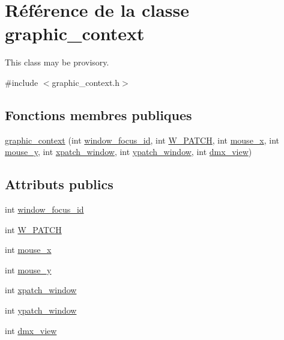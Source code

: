 \hypertarget{classgraphic__context}{\section{Référence de la classe graphic\+\_\+context}
\label{classgraphic__context}
}


This class may be provisory.  




{\ttfamily \#include $<$graphic\+\_\+context.\+h$>$}

\subsection*{Fonctions membres publiques}
\begin{DoxyCompactItemize}
\item 
\hyperlink{classgraphic__context_ac81331f894194151dc9f2f20f6eb86e6}{graphic\+\_\+context} (int \hyperlink{classgraphic__context_afb842574bef9200a343eae5ed25b6aea}{window\+\_\+focus\+\_\+id}, int \hyperlink{classgraphic__context_af8795c6d73bb4076febf90a4bed34cd7}{W\+\_\+\+P\+A\+T\+C\+H}, int \hyperlink{classgraphic__context_af9aa907f4c540927888920111f2a3890}{mouse\+\_\+x}, int \hyperlink{classgraphic__context_a72195ff30744dcb9c467cad5bda4e602}{mouse\+\_\+y}, int \hyperlink{classgraphic__context_a57a5bcca338d0b27c5014b9bde3f6e99}{xpatch\+\_\+window}, int \hyperlink{classgraphic__context_ae902bd96df3912441f3f5e99cd802fbf}{ypatch\+\_\+window}, int \hyperlink{classgraphic__context_abeabd1716cb7451605935b9191be65fb}{dmx\+\_\+view})
\end{DoxyCompactItemize}
\subsection*{Attributs publics}
\begin{DoxyCompactItemize}
\item 
int \hyperlink{classgraphic__context_afb842574bef9200a343eae5ed25b6aea}{window\+\_\+focus\+\_\+id}
\item 
int \hyperlink{classgraphic__context_af8795c6d73bb4076febf90a4bed34cd7}{W\+\_\+\+P\+A\+T\+C\+H}
\item 
int \hyperlink{classgraphic__context_af9aa907f4c540927888920111f2a3890}{mouse\+\_\+x}
\item 
int \hyperlink{classgraphic__context_a72195ff30744dcb9c467cad5bda4e602}{mouse\+\_\+y}
\item 
int \hyperlink{classgraphic__context_a57a5bcca338d0b27c5014b9bde3f6e99}{xpatch\+\_\+window}
\item 
int \hyperlink{classgraphic__context_ae902bd96df3912441f3f5e99cd802fbf}{ypatch\+\_\+window}
\item 
int \hyperlink{classgraphic__context_abeabd1716cb7451605935b9191be65fb}{dmx\+\_\+view}
\end{DoxyCompactItemize}


